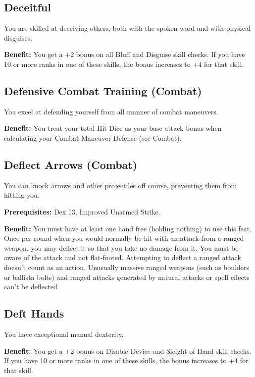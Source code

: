 \subsection{Deceitful}

				
You are skilled at deceiving others, both with the spoken word and with physical disguises.
				
\textbf{Benefit:} You get a +2 bonus on all Bluff and Disguise skill checks. If you have 10 or more ranks in one of these skills, the bonus increases to +4 for that skill.
				
\subsection{Defensive Combat Training (Combat)}

				
You excel at defending yourself from all manner of combat maneuvers.
				
\textbf{Benefit:} You treat your total Hit Dice as your base attack bonus when calculating your Combat Maneuver Defense (see Combat). 
				
\subsection{Deflect Arrows (Combat)}

				
You can knock arrows and other projectiles off course, preventing them from hitting you.
				
\textbf{Prerequisites:} Dex 13, Improved Unarmed Strike.
				
\textbf{Benefit:} You must have at least one hand free (holding nothing) to use this feat. Once per round when you would normally be hit with an attack from a ranged weapon, you may deflect it so that you take no damage from it. You must be aware of the attack and not flat-footed. Attempting to deflect a ranged attack doesn't count as an action. Unusually massive ranged weapons (such as boulders or ballista bolts) and ranged attacks generated by natural attacks or spell effects can't be deflected.
				
\subsection{Deft Hands}

				
You have exceptional manual dexterity.
				
\textbf{Benefit:} You get a +2 bonus on Disable Device and Sleight of Hand skill checks. If you have 10 or more ranks in one of these skills, the bonus increases to +4 for that skill.
				

